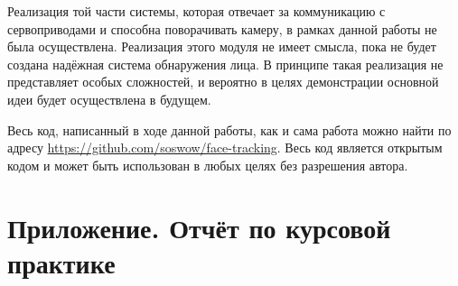 \documentclass[12pt]{report}
\begin{document}
Реализация той части системы, которая отвечает за коммуникацию с сервоприводами и способна поворачивать камеру, в рамках данной работы не была осуществлена. Реализация этого модуля не имеет смысла, пока не будет создана надёжная система обнаружения лица. В принципе такая реализация не представляет особых сложностей, и вероятно в целях демонстрации основной идеи будет осуществлена в будущем. 

Весь код, написанный в ходе данной работы, как и сама работа можно найти по адресу \url{https://github.com/soswow/face-tracking}. Весь код является открытым кодом и может быть использован в любых целях без разрешения автора.

\appendix
\chapter{Приложение. Отчёт по курсовой практике}









\end{document}

